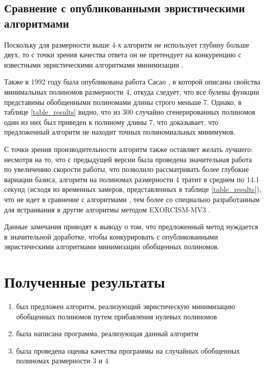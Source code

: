 \documentclass[a4paper,12pt,titlepage]{article}
\begin{document}
\subsection{Сравнение с опубликованными эвристическими алгоритмами}

Поскольку для размерности выше 4-х алгоритм не использует глубину больше двух, то с точки зрения качества ответа он не претендует на конкуренцию с известными эвристическими алгоритмами минимизации \cite{exmin2, exorcism4, exorcism-mv3, grmin2}.

Также в 1992 году была опубликована работа Сасао \cite{4var-min}, в которой описаны свойства минимальных полиномов размерности 4, откуда следует, что все булевы функции представимы обобщенными полиномами длины строго меньше 7. Однако, в таблице \ref{table_results} видно, что из 300 случайно сгенерированных полиномов один из них был приведен к полиному длины 7, что доказывает, что предложенный алгоритм не находит точных полиномиальных минимумов.

С точки зрения производительности алгоритм также оставляет желать лучшего: несмотря на то, что с предыдущей версии была проведена значительная работа по увеличению скорости работы, что позволило рассматривать более глубокие вариации базиса, алгоритм на полиномах размерности 4 тратит в среднем по 14.1 секунд (исходя из временных замеров, представленных в таблице \ref{table_results}), что не идет в сравнение с алгоритмами \cite{exmin2, exorcism4, grmin2}, тем более со специально разработанным для встраивания в другие алгоритмы методом \textsc{EXORCISM-MV3} \cite{exorcism-mv3}.

Данные замечания приводят к выводу о том, что предложенный метод нуждается в значительной доработке, чтобы конкурировать с опубликованными эвристическими алгоритмами минимизации обобщенных полиномов.

\section{Полученные результаты}

\begin{enumerate}
    \item был предложен алгоритм, реализующий эвристическую минимизацию обобщенных полиномов путем прибавления нулевых полиномов
    \item была написана программа, реализующая данный алгоритм
    \item была проведена оценка качества программы на случайных обобщенных полиномах размерности 3 и 4
\end{enumerate}
\end{document}

